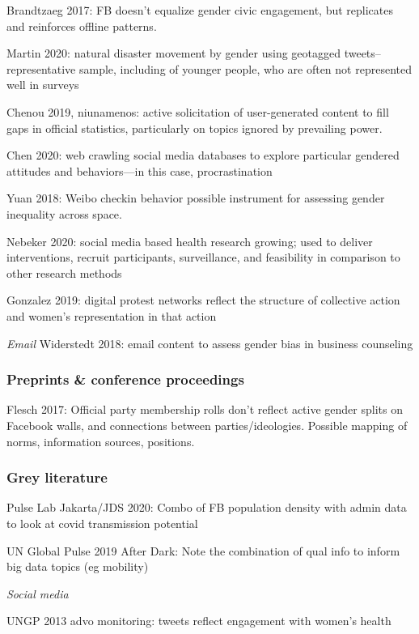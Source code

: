 \documentclass{article}
\begin{document}
Brandtzaeg 2017: FB doesn't equalize gender civic engagement, but replicates and reinforces offline patterns.

Martin 2020: natural disaster movement by gender using geotagged tweets--representative sample, including of younger people, who are often not represented well in surveys

Chenou 2019, niunamenos: active solicitation of user-generated content to fill gaps in official statistics, particularly on topics ignored by prevailing power.

Chen 2020: web crawling social media databases to explore particular gendered attitudes and behaviors---in this case, procrastination

Yuan 2018: Weibo checkin behavior possible instrument for assessing gender inequality across space.

Nebeker 2020: social media based health research growing; used to deliver interventions, recruit participants, surveillance, and feasibility in comparison to other research methods

Gonzalez 2019: digital protest networks reflect the structure of collective action and women's representation in that action


\textit{Email}
Widerstedt 2018: email content to assess gender bias in business counseling

\subsubsection{Preprints \& conference proceedings}

Flesch 2017: Official party membership rolls don't reflect active gender splits on Facebook walls, and connections between parties/ideologies. Possible mapping of norms, information sources, positions.



\subsubsection{Grey literature}

Pulse Lab Jakarta/JDS 2020: Combo of FB population density with admin data to look at covid transmission potential 

UN Global Pulse 2019 After Dark: Note the combination of qual info to inform big data topics (eg mobility)

\textit{Social media}

UNGP 2013 advo monitoring: tweets reflect engagement with women's health
\end{document}
